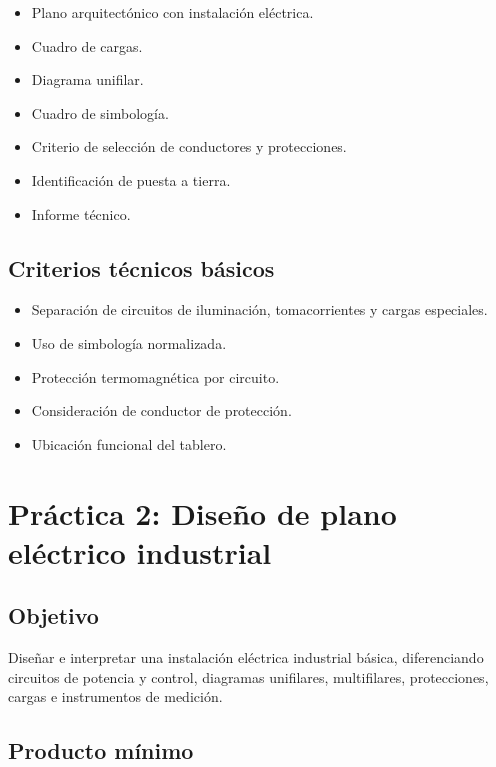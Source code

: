 \documentclass[
  spanish,
  letterpaper,
  DIV=11,
  numbers=noendperiod]{scrreprt}
\providecommand{\tightlist}{%
  \setlength{\itemsep}{0pt}\setlength{\parskip}{0pt}}
\begin{document}
\begin{itemize}
\tightlist
\item
  Plano arquitectónico con instalación eléctrica.
\item
  Cuadro de cargas.
\item
  Diagrama unifilar.
\item
  Cuadro de simbología.
\item
  Criterio de selección de conductores y protecciones.
\item
  Identificación de puesta a tierra.
\item
  Informe técnico.
\end{itemize}

\subsection{Criterios técnicos
básicos}\label{criterios-tuxe9cnicos-buxe1sicos}

\begin{itemize}
\tightlist
\item
  Separación de circuitos de iluminación, tomacorrientes y cargas
  especiales.
\item
  Uso de simbología normalizada.
\item
  Protección termomagnética por circuito.
\item
  Consideración de conductor de protección.
\item
  Ubicación funcional del tablero.
\end{itemize}

\section{Práctica 2: Diseño de plano eléctrico
industrial}\label{pruxe1ctica-2-diseuxf1o-de-plano-eluxe9ctrico-industrial}

\subsection{Objetivo}\label{objetivo-1}

Diseñar e interpretar una instalación eléctrica industrial básica,
diferenciando circuitos de potencia y control, diagramas unifilares,
multifilares, protecciones, cargas e instrumentos de medición.

\subsection{Producto mínimo}\label{producto-muxednimo-1}
\end{document}
